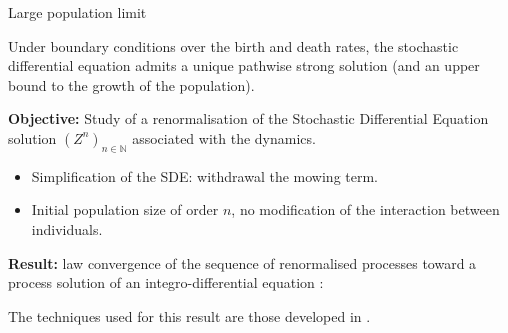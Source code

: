 \documentclass{myBeamer}
\newcommand{\D}{\mathbb D}%
\newcommand{\E}{\mathbb E}%
\newcommand{\N}{\mathbb N}%
\newcommand{\R}{\mathbb R}%
\newcommand{\Mcal}{\mathcal{M}}%
\begin{document}
\begin{frame}{Large population limit}


Under boundary conditions over the birth and death rates, the stochastic differential equation admits a unique pathwise strong solution (and an upper bound to the growth of the population). 


\bigbreak

\textbf{Objective:} Study of a renormalisation of the Stochastic Differential Equation solution $(Z^n)_{n \in \N}$ associated with the dynamics. 

\begin{itemize}
\item Simplification of the SDE: withdrawal the mowing term.

\item Initial population size of order $n$, no modification of the interaction between individuals. 
\end{itemize}

\smallbreak
\textbf{Result:} law convergence of the sequence of renormalised processes toward a process solution of an integro-differential equation :



\smallbreak
The techniques used for this result are those developed in \cite{tran2006modeles}.



\end{frame}
\end{document}
